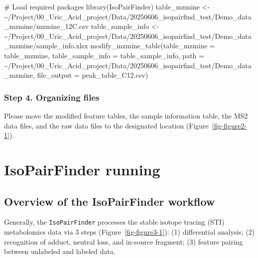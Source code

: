 \documentclass[
  letterpaper,
  DIV=11,
  numbers=noendperiod]{scrreprt}
\newenvironment{Shaded}{\begin{snugshade}}{\end{snugshade}}
\newcommand{\AttributeTok}[1]{\textcolor[rgb]{0.40,0.45,0.13}{#1}}
\newcommand{\CommentTok}[1]{\textcolor[rgb]{0.37,0.37,0.37}{#1}}
\newcommand{\FunctionTok}[1]{\textcolor[rgb]{0.28,0.35,0.67}{#1}}
\newcommand{\NormalTok}[1]{\textcolor[rgb]{0.00,0.23,0.31}{#1}}
\newcommand{\OtherTok}[1]{\textcolor[rgb]{0.00,0.23,0.31}{#1}}
\newcommand{\StringTok}[1]{\textcolor[rgb]{0.13,0.47,0.30}{#1}}
\begin{document}
\begin{Shaded}
\begin{Highlighting}[]
\CommentTok{\# Load required packages}
\FunctionTok{library}\NormalTok{(IsoPairFinder)}
\NormalTok{table\_mzmine }\OtherTok{\textless{}{-}} \StringTok{\textquotesingle{}\textasciitilde{}/Project/00\_Uric\_Acid\_project/Data/20250606\_isopairfind\_test/Demo\_data\_mzmine/mzmine\_12C.csv\textquotesingle{}}
\NormalTok{table\_sample\_info }\OtherTok{\textless{}{-}} \StringTok{\textquotesingle{}\textasciitilde{}/Project/00\_Uric\_Acid\_project/Data/20250606\_isopairfind\_test/Demo\_data\_mzmine/sample\_info.xlsx\textquotesingle{}}
\FunctionTok{modify\_mzmine\_table}\NormalTok{(}\AttributeTok{table\_mzmine =}\NormalTok{ table\_mzmine,}
                    \AttributeTok{table\_sample\_info =}\NormalTok{ table\_sample\_info,}
                    \AttributeTok{path =} \StringTok{\textquotesingle{}\textasciitilde{}/Project/00\_Uric\_Acid\_project/Data/20250606\_isopairfind\_test/Demo\_data\_mzmine\textquotesingle{}}\NormalTok{,}
                    \AttributeTok{file\_output =} \StringTok{\textquotesingle{}peak\_table\_C12.csv\textquotesingle{}}\NormalTok{)}
\end{Highlighting}
\end{Shaded}

\subsection{Step 4. Organizing files}\label{step-4.-organizing-files-2}

Please move the modified feature tables, the sample information table,
the MS2 data files, and the raw data files to the designated location
(Figure~\ref{fig-figure2-1}).


\chapter{IsoPairFinder running}\label{sec-isoPairFinder-running}

\section{Overview of the IsoPairFinder
workflow}\label{overview-of-the-isopairfinder-workflow}

Generally, the \texttt{IsoPairFinder} processes the stable isotope
tracing (STI) metabolomics data via 3 steps
(Figure~\ref{fig-figure3-1}): (1) differential analysis; (2) recognition
of adduct, neutral loss, and in-source fragment; (3) feature pairing
between unlabeled and labeled data.
\end{document}
